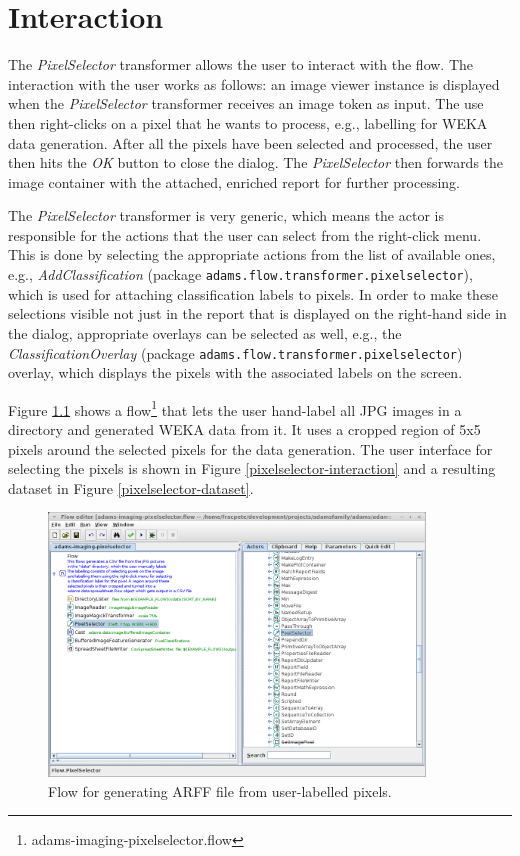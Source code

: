 \documentclass[a4paper]{book}
\begin{document}
\chapter{Interaction}
The \textit{PixelSelector} transformer allows the user to interact with the
flow. The interaction with the user works as follows: an image viewer instance
is displayed when the \textit{PixelSelector} transformer receives an image token
as input. The use then right-clicks on a pixel that he wants to process, e.g.,
labelling for WEKA data generation. After all the pixels have been selected and
processed, the user then hits the \textit{OK} button to close the dialog. The
\textit{PixelSelector} then forwards the image container with the
attached, enriched report for further processing.

The \textit{PixelSelector} transformer is very generic, which means the actor
is responsible for the actions that the user can select from the right-click
menu. This is done by selecting the appropriate actions from the list of
available ones, e.g., \textit{AddClassification} (package
\texttt{adams.flow.transformer.pixelselector}), which is used for attaching
classification labels to pixels. In order to make these selections visible not
just in the report that is displayed on the right-hand side in the dialog,
appropriate overlays can be selected as well, e.g., the
\textit{ClassificationOverlay} (package
\texttt{adams.flow.transformer.pixelselector}) overlay, which displays the
pixels with the associated labels on the screen.

Figure \ref{pixelselector-flow} shows a
flow\footnote{adams-imaging-pixelselector.flow} that lets the user hand-label
all JPG images in a directory and generated WEKA data from it. It uses a cropped
region of 5x5 pixels around the selected pixels for the data generation. The
user interface for selecting the pixels is shown in Figure
\ref{pixelselector-interaction} and a resulting dataset in Figure
\ref{pixelselector-dataset}.

\begin{figure}[htb]
  \centering
  \includegraphics[width=10.0cm]{images/pixelselector-flow.png}
  \caption{Flow for generating ARFF file from user-labelled pixels.}
  \label{pixelselector-flow}
\end{figure}
\end{document}
